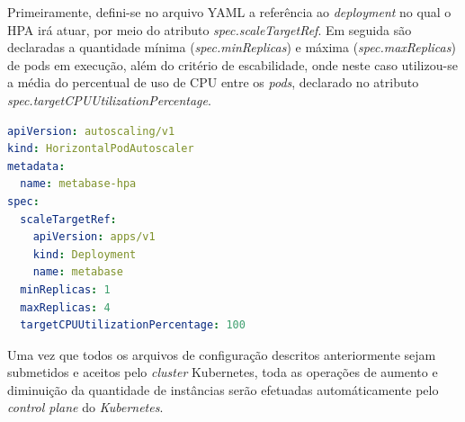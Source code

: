 Primeiramente, defini-se no arquivo YAML a referência ao \textit{deployment} no qual o HPA irá atuar, por meio do atributo \textit{spec.scaleTargetRef}. Em seguida são declaradas a quantidade mínima (\textit{spec.minReplicas}) e máxima (\textit{spec.maxReplicas}) de pods em execução, além do critério de escabilidade, onde neste caso utilizou-se a média do percentual de uso de CPU entre os \textit{pods}, declarado no atributo \textit{spec.targetCPUUtilizationPercentage}.  

\begin{lstlisting}[caption={YAML de configuração do HPA},label={lst:hpa},language=yaml]
apiVersion: autoscaling/v1
kind: HorizontalPodAutoscaler
metadata:
  name: metabase-hpa
spec:
  scaleTargetRef:
    apiVersion: apps/v1
    kind: Deployment
    name: metabase
  minReplicas: 1
  maxReplicas: 4
  targetCPUUtilizationPercentage: 100
\end{lstlisting} 

Uma vez que todos os arquivos de configuração descritos anteriormente sejam submetidos e aceitos pelo \textit{cluster} Kubernetes, toda as operações de aumento e diminuição da quantidade de instâncias serão efetuadas automáticamente pelo \textit{control plane} do \textit{Kubernetes}.  
